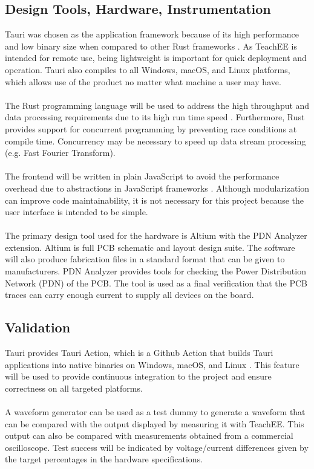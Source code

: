 \documentclass[letterpaper,12pt]{article}
\begin{document}
\subsection{Design Tools, Hardware, Instrumentation}
Tauri was chosen as the application framework because of its high performance
and low binary size when compared to other Rust frameworks 
\cite{tauri_benchmarks}. As TeachEE is intended for remote use, being
lightweight is important for quick deployment and operation. Tauri also compiles
to all Windows, macOS, and Linux platforms, which allows use of the product no
matter what machine a user may have.
\\~\\
The Rust programming language will be used to address the high throughput and
data processing requirements due to its high run time speed \cite{rust_speed}.
Furthermore, Rust provides support for concurrent programming by preventing race
conditions at compile time. Concurrency may be necessary to speed up data stream
processing (e.g. Fast Fourier Transform).
\\~\\
The frontend will be written in plain JavaScript to avoid the performance
overhead due to abstractions in JavaScript frameworks \cite{javascript_speed}.
Although modularization can improve code maintainability, it is not necessary
for this project because the user interface is intended to be simple.
\\~\\
The primary design tool used for the hardware is Altium with the PDN Analyzer
extension. Altium is full PCB schematic and layout design suite. The software
will also produce fabrication files in a standard format that can be given to
manufacturers. PDN Analyzer provides tools for checking the Power Distribution
Network (PDN) of the PCB. The tool is used as a final verification that the PCB
traces can carry enough current to supply all devices on the board.

\subsection{Validation}
Tauri provides Tauri Action, which is a Github Action that builds Tauri
applications into native binaries on Windows, macOS, and Linux
\cite{tauri_actions}. This feature will be used to provide continuous integration
to the project and ensure correctness on all targeted platforms.
\\~\\
A waveform generator can be used as a test dummy to generate a waveform that
can be compared with the output displayed by measuring it with TeachEE.
This output can also be compared with measurements obtained from a commercial
oscilloscope. Test success will be indicated by voltage/current differences
given by the target percentages in the hardware specifications.
\end{document}
